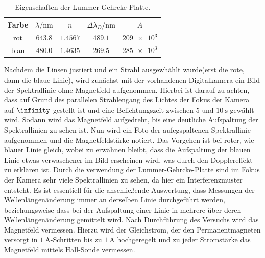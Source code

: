\begin{table}
    \centering
    \begin{tabular}{ccccc}
		\toprule
		Farbe & $\lambda/\si{\nano\meter}$& $n$ & $\Delta\lambda_D/\si{\nano\meter}$& $A$\\\midrule
		rot & $\num{643,8}$ & $\num{1,4567}$ & $\num{489,1}$ & $\num{209e3}$\\
		blau & $\num{480,0}$& $\num{1,4635}$ & $\num{269,5}$ & $\num{285e3}$\\\bottomrule
\end{tabular}
    \caption{Eigenschaften der Lummer-Gehrcke-Platte.}
    \label{tab3}
\end{table}

\noindent Nachdem die Linsen justiert und ein Strahl ausgewhählt wurde(erst die rote,
dann die blaue Linie), wird zunächst
mit der vorhandenen Digitalkamera ein Bild der Spektrallinie ohne Magnetfeld aufgenommen.
Hierbei ist darauf zu achten, dass auf Grund des parallelen Strahlengang des Lichtes der
Fokus der Kamera auf $\infinity$ gestellt ist und eine Belichtungszeit zwischen $5$ und
$\SI{10}{\second}$ gewählt wird.
Sodann wird das Magnetfeld aufgedreht, bis eine deutliche Aufspaltung der Spektrallinien
zu sehen ist. Nun wird ein Foto der aufegspaltenen Spektrallinie aufgenommen und die Magnetfeldstärke
notiert. Das Vorgehen ist bei roter, wie blauer Linie gleich, wobei zu erwähnen bleibt, dass die
Aufspaltung der blauen Linie etwas verwaschener im Bild erscheinen wird, was durch den Dopplereffekt
zu erklären ist.
Durch die verwendung der Lummer-Gehrcke-Platte sind im Fokus der Kamera sehr viele Spektrallinien zu sehen,
da hier ein Interferenzmuster entsteht. Es ist essentiell für die anschließende Auswertung, dass Messungen
der Wellenlängenänderung immer an derselben Linie durchgeführt werden, beziehungsweise dass bei der
Aufspaltung einer Linie in mehrere über deren Wellenlängenänderung gemittelt wird.
Nach Durchführung des Versuchs wird das Magnetfeld vermessen. Hierzu wird der Gleichstrom,
der den Permanentmagneten versorgt in $\SI{1}{\ampere}$-Schritten bis zu $\SI{1}{\ampere}$ hochgeregelt und zu
jeder Stromstärke das Magnetfeld mittels Hall-Sonde vermessen.
